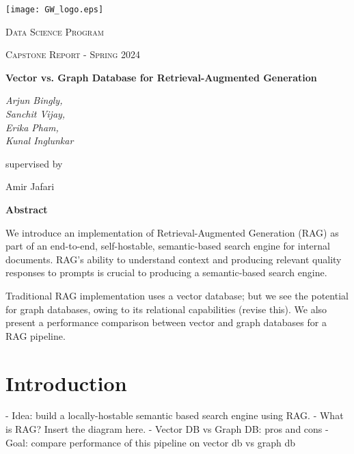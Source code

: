 \documentclass{scrartcl}
\renewenvironment{abstract}{
    \centering
    \textbf{Abstract}
    \vspace{0.5cm}
    \par\itshape
    \begin{minipage}{0.7\linewidth}}{\end{minipage}
    \noindent\ignorespaces
}
\begin{document}
\begin{titlepage}
	\centering
	\texttt{[image: GW\_logo.eps]}\par
	\vspace{2cm}
	{\scshape\LARGE Data Science Program \par}
	\vspace{1cm}
	{\scshape\Large Capstone Report - Spring 2024\par}
	\vspace{1.5cm}
	{\huge\bfseries Vector vs. Graph Database for Retrieval-Augmented Generation\par}
	\vspace{2cm}
	{\Large\itshape Arjun Bingly,\\ Sanchit Vijay,\\ Erika Pham,\\Kunal Inglunkar}\par
	\vspace{1.5cm}
	supervised by\par
	Amir Jafari

	\vfill
	\begin{abstract}
	    We introduce an implementation of Retrieval-Augmented Generation (RAG) as part of an end-to-end, self-hostable, semantic-based search engine for internal documents. RAG’s ability to understand context and producing relevant quality responses to prompts is crucial to producing a semantic-based search engine.

		Traditional RAG implementation uses a vector database; but we see the potential for graph databases, owing to its relational capabilities (revise this). We also present a performance comparison between vector and graph databases for a RAG pipeline. 
	\end{abstract}
	\vfill
\end{titlepage}
\tableofcontents
\newpage
\section{Introduction}
- Idea: build a locally-hostable semantic based search engine using RAG. 
- What is RAG? Insert the diagram here.
- Vector DB vs Graph DB: pros and cons
- Goal: compare performance of this pipeline on vector db vs graph db
\end{document}
